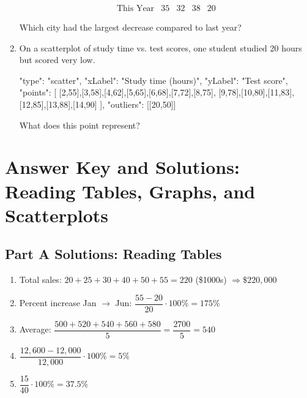 \documentclass[14pt]{extarticle}
\begin{document}
\begin{enumerate}
\[\begin{array}{c|cccc}
  \text{This Year} & 35 & 32 & 38 & 20
  \end{array}
  \]
  Which city had the largest decrease compared to last year?
  \item On a scatterplot of study time vs. test scores, one student studied 20 hours but scored very low.
  \begin{diagramdata}
  {
    "type": "scatter",
    "xLabel": "Study time (hours)",
    "yLabel": "Test score",
    "points": [
      [2,55],[3,58],[4,62],[5,65],[6,68],[7,72],[8,75],
      [9,78],[10,80],[11,83],[12,85],[13,88],[14,90]
    ],
    "outliers": [[20,50]]
  }
  \end{diagramdata}
  What does this point represent?
\end{enumerate}

\newpage


\section*{Answer Key and Solutions: Reading Tables, Graphs, and Scatterplots}

\subsection*{Part A Solutions: Reading Tables}
\begin{enumerate}
  \item Total sales: \(20+25+30+40+50+55=220\) (\$1000s) \(\Rightarrow \boxed{\$220{,}000}\)
  \item Percent increase Jan \(\to\) Jun: \(\dfrac{55-20}{20}\cdot100\%=\boxed{175\%}\)
  \item Average: \(\dfrac{500+520+540+560+580}{5}=\dfrac{2700}{5}=\boxed{540}\)
  \item \(\dfrac{12{,}600-12{,}000}{12{,}000}\cdot100\%=\boxed{5\%}\)
  \item \(\dfrac{15}{40}\cdot100\%=\boxed{37.5\%}\)
\end{enumerate}
\end{document}

